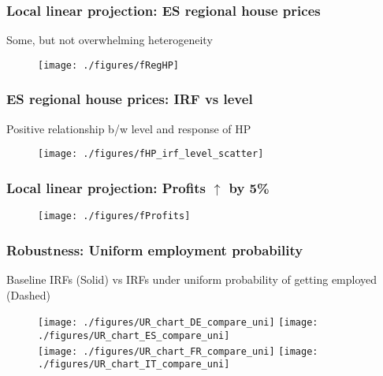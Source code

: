 \documentclass[pdflatex,aspectratio=169]{beamer}
\begin{document}
\begin{frame}\frametitle{\bf Local linear projection:   ES regional house prices \hyperlink{Robust}{} \hypertarget{ESlocalHP}{}}
Some, but not overwhelming heterogeneity
\vspace*{-5mm}
\begin{figure}
\begin{center}
\texttt{[image: ./figures/fRegHP]}\\
\end{center}
\end{figure}

\end{frame}



\begin{frame}\frametitle{\bf ES regional house prices: IRF vs level \hyperlink{Robust}{} \hypertarget{ESlocalHPlevel}{}}
Positive relationship b/w level and response of HP
\begin{figure}
\begin{center}
\texttt{[image: ./figures/fHP\_irf\_level\_scatter]}\\
\end{center}
\end{figure}

\end{frame}


\begin{frame}\frametitle{\bf Local linear projection:   Profits $\uparrow$ by 5\% \hyperlink{Robust}{} \hypertarget{finInc}{}}
\begin{figure}
\begin{center}
\texttt{[image: ./figures/fProfits]}\\
\end{center}
\end{figure}

\end{frame}


\begin{frame}\frametitle{\bf Robustness: Uniform employment probability \hypertarget{UniformEmpProb}{}}
{\scriptsize Baseline IRFs (Solid) vs IRFs under uniform probability of getting employed (Dashed) \hyperlink{Robust}{}}

\begin{figure}
\begin{center}
\texttt{[image: ./figures/UR\_chart\_DE\_compare\_uni]}
\texttt{[image: ./figures/UR\_chart\_ES\_compare\_uni]}\\
\texttt{[image: ./figures/UR\_chart\_FR\_compare\_uni]}
\texttt{[image: ./figures/UR\_chart\_IT\_compare\_uni]}
\end{center}
\end{figure}
\end{frame}
\end{document}

